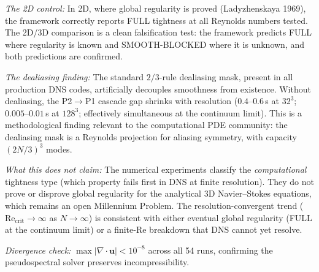 \documentclass[11pt,a4paper]{article}
\begin{document}
\emph{The 2D control:} In 2D, where global regularity is proved (Ladyzhenskaya 1969), the framework correctly reports FULL tightness at all Reynolds numbers tested.  The 2D/3D comparison is a clean falsification test: the framework predicts FULL where regularity is known and SMOOTH-BLOCKED where it is unknown, and both predictions are confirmed.

\emph{The dealiasing finding:} The standard $2/3$-rule dealiasing mask, present in all production DNS codes, artificially decouples smoothness from existence.  Without dealiasing, the P2$\to$P1 cascade gap shrinks with resolution ($0.4$--$0.6$\,s at $32^3$; $0.005$--$0.01$\,s at $128^3$; effectively simultaneous at the continuum limit).  This is a methodological finding relevant to the computational PDE community: the dealiasing mask is a Reynolds projection for aliasing symmetry, with capacity $(2N/3)^3$ modes.

\emph{What this does not claim:} The numerical experiments classify the \emph{computational} tightness type (which property fails first in DNS at finite resolution).  They do not prove or disprove global regularity for the analytical 3D Navier--Stokes equations, which remains an open Millennium Problem.  The resolution-convergent trend ($\mathrm{Re}_{\mathrm{crit}} \to \infty$ as $N \to \infty$) is consistent with either eventual global regularity (FULL at the continuum limit) or a finite-Re breakdown that DNS cannot yet resolve.

\emph{Divergence check:} $\max|\nabla \cdot \mathbf{u}| < 10^{-8}$ across all 54 runs, confirming the pseudospectral solver preserves incompressibility.
\end{document}

